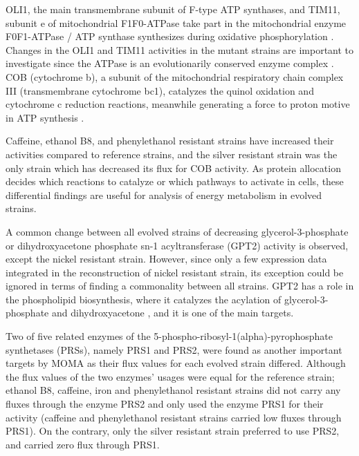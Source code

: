 OLI1, the main transmembrane subunit of F-type ATP synthases, and TIM11, subunit e of mitochondrial F1F0-ATPase take part in the mitochondrial enzyme F0F1-ATPase / ATP synthase synthesizes during oxidative phosphorylation \cite{arnold1997yeast, trembath1975biogenesis}. Changes in the OLI1 and TIM11 activities in the mutant strains  are important to investigate since the ATPase is an evolutionarily conserved enzyme complex \cite{tokatlidis1996translocation}. COB (cytochrome b), a subunit of the mitochondrial respiratory chain complex III (transmembrane cytochrome bc1), catalyzes the quinol oxidation and cytochrome c reduction reactions, meanwhile generating a force to proton motive in ATP synthesis \cite{meunier2013respiratory}.

Caffeine, ethanol B8, and phenylethanol resistant strains have increased their activities compared to reference strains, and the silver resistant strain was the only strain which has decreased its flux for COB activity. As protein allocation decides which reactions to catalyze or which pathways to activate in cells, these differential findings are useful for analysis of energy metabolism in evolved strains.

A common change between all evolved strains of decreasing glycerol-3-phosphate or dihydroxyacetone phosphate sn-1 acyltransferase (GPT2) activity is observed, except the nickel resistant strain. However, since only a few expression data integrated in the reconstruction of nickel resistant strain, its exception could be ignored in terms of finding a commonality between all strains. GPT2 has a role in the phospholipid biosynthesis, where it catalyzes the acylation of glycerol-3-phosphate and dihydroxyacetone \cite{athenstaedt1997biosynthesis}, and it is one of the main targets.

Two of five related enzymes of the 5-phospho-ribosyl-1(alpha)-pyrophosphate synthetases (PRSs), namely PRS1 and PRS2, were found as another important targets by MOMA as their flux values for each evolved strain differed. Although the flux values of the two enzymes' usages were equal for the reference strain; ethanol B8, caffeine, iron and phenylethanol resistant strains did not carry any fluxes through the enzyme PRS2 and only used the enzyme PRS1 for their activity (caffeine and phenylethanol resistant strains carried low fluxes through PRS1). On the contrary, only the silver resistant strain preferred to use PRS2, and carried zero flux through PRS1.

